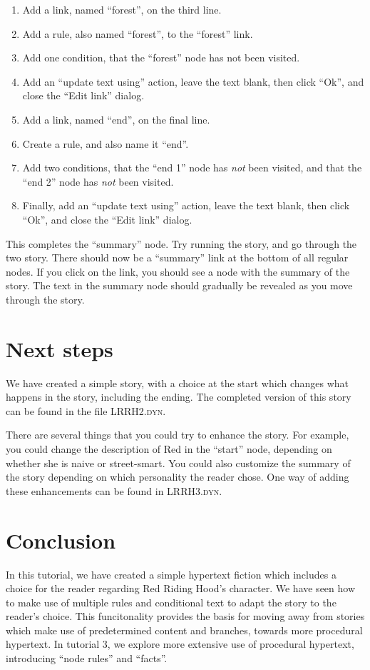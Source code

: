 \documentclass{article}
\begin{document}
\begin{enumerate}
  \item Add a link, named ``forest'', on the third line.
  \item Add a rule, also named ``forest'', to the ``forest'' link.
  \item Add one condition, that the ``forest'' node has not been visited.
  \item Add an ``update text using'' action, leave the text blank, then click
  ``Ok'', and close the ``Edit link'' dialog.
  \item Add a link, named ``end'', on the final line.
  \item Create a rule, and also name it ``end''.
  \item Add two conditions, that the ``end 1'' node has \textit{not} been
  visited, and that the ``end 2'' node has \textit{not} been visited.
  \item Finally, add an ``update text using'' action, leave the text blank,
  then click ``Ok'', and close the ``Edit link'' dialog.
\end{enumerate}

This completes the ``summary'' node. Try running the story, and go through
the two story. There should now be a ``summary'' link at the bottom of all
regular nodes. If you click on the link, you should see a node with the summary
of the story. The text in the summary node should gradually be revealed as you
move through the story.

\section{Next steps}

We have created a simple story, with a choice at the start which changes what
happens in the story, including the ending. The completed version of this story
can be found in the file \textsc{LRRH2.dyn}.

There are several things that you could try to enhance the story. For example,
you could change the description of Red in the ``start'' node, depending on
whether she is naive or street-smart. You could also customize the summary of
the story depending on which personality the reader chose. One way of adding
these enhancements can be found in \textsc{LRRH3.dyn}.

\section{Conclusion}

In this tutorial, we have created a simple hypertext fiction which includes a
choice for the reader regarding Red Riding Hood's character. We have seen how to
make use of multiple rules and conditional text to adapt the story to the
reader's choice. This funcitonality provides the basis for moving away from
stories which make use of predetermined content and branches, towards more
procedural hypertext. In tutorial 3, we explore more extensive use of procedural
hypertext, introducing ``node rules'' and ``facts''.
\end{document}
